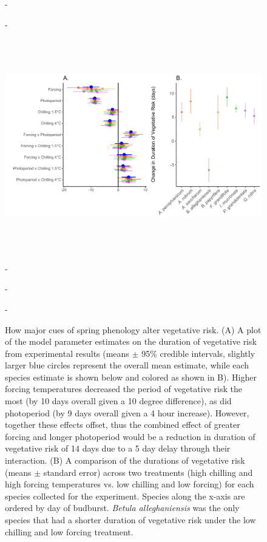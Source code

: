 \documentclass{article}\usepackage[]{graphicx}\usepackage[]{color}
\begin{document}
\begin{figure} [H] 
 -\begin{center}
 -\includegraphics[width=16cm, height=10cm]{..//figure/DVR_diffplots_nophoto.pdf} 
 -\caption{How major cues of spring phenology alter vegetative risk. (A) A plot of the model parameter estimates on the duration of vegetative risk from experimental results (means $\pm$ 95\% credible intervals, slightly larger blue circles represent the overall mean estimate, while each species estimate is shown below and colored as shown in B). Higher forcing temperatures decreased the period of vegetative risk the most (by 10 days overall given a 10 degree difference), as did photoperiod (by 9 days overall given a 4 hour increase). However, together these effects offset, thus the combined effect of greater forcing and longer photoperiod would be a reduction in duration of vegetative risk of 14 days due to a 5 day delay through their interaction. (B) A comparison of the durations of vegetative risk (means $\pm$ standard error) across two treatments (high chilling and high forcing temperatures vs. low chilling and low forcing) for each species collected for the experiment. Species along the x-axis are ordered by day of budburst. \textit{Betula alleghaniensis} was the only species that had a shorter duration of vegetative risk under the low chilling and low forcing treatment. }\label{fig:dan} 
 -\end{center}
 -\end{figure}
\end{document}
